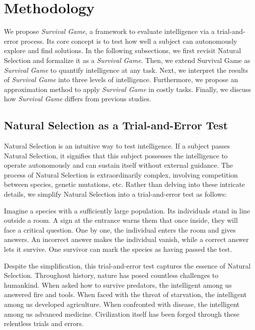 \section{Methodology}
\label{sec:define_intelligence_test}

We propose \textit{Survival Game}, a framework to evaluate intelligence via a trial-and-error process.
Its core concept is to test how well a subject can autonomously explore and find solutions.
In the following subsections, we first revisit Natural Selection and formalize it as a \textit{Survival Game}. Then, we extend Survival Game as \textit{Survival Game} to quantify intelligence at any task. Next, we interpret the results of \textit{Survival Game} into three levels of intelligence. Furthermore, we propose an approximation method to apply \textit{Survival Game} in costly tasks.
Finally, we discuss how \textit{Survival Game} differs from previous studies.


\subsection{Natural Selection as a Trial-and-Error Test}





Natural Selection is an intuitive way to test intelligence. If a subject passes Natural Selection, it signifies that this subject possesses the intelligence to operate autonomously and can sustain itself without external guidance.
The process of Natural Selection is extraordinarily complex, involving competition between species, genetic mutations, etc. Rather than delving into these intricate details, we simplify Natural Selection into a trial-and-error test as follows:

\begin{definition}
Imagine a species with a sufficiently large population. Its individuals stand in line outside a room. A sign at the entrance warns them that once inside, they will face a critical question. One by one, the individual enters the room and gives answers. An incorrect answer makes the individual vanish, while a correct answer lets it survive. One survivor can mark the species as having passed the test.
\end{definition}


Despite the simplification, this trial-and-error test captures the essence of Natural Selection. Throughout history, nature has posed countless challenges to humankind. When asked how to survive predators, the intelligent among us answered fire and tools. When faced with the threat of starvation, the intelligent among us developed agriculture. When confronted with disease, the intelligent among us advanced medicine. Civilization itself has been forged through these relentless trials and errors. 

